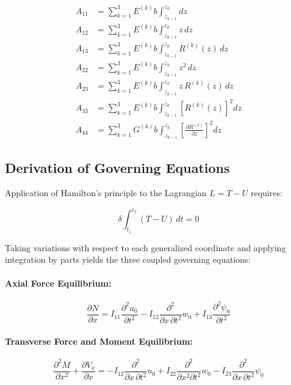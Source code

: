 \documentclass[12pt,a4paper]{report}
\begin{document}
\begin{align}
A_{11} &= \sum_{k=1}^{3} E^{(k)} b \int_{z_{k-1}}^{z_k} dz \\[6pt]
A_{12} &= \sum_{k=1}^{3} E^{(k)} b \int_{z_{k-1}}^{z_k} z \, dz \\[6pt]
A_{13} &= \sum_{k=1}^{3} E^{(k)} b \int_{z_{k-1}}^{z_k} R^{(k)}(z) \, dz \\[6pt]
A_{22} &= \sum_{k=1}^{3} E^{(k)} b \int_{z_{k-1}}^{z_k} z^2 \, dz \\[6pt]
A_{23} &= \sum_{k=1}^{3} E^{(k)} b \int_{z_{k-1}}^{z_k} z \, R^{(k)}(z) \, dz \\[6pt]
A_{33} &= \sum_{k=1}^{3} E^{(k)} b \int_{z_{k-1}}^{z_k} \left[R^{(k)}(z)\right]^2 dz \\[6pt]
A_{44} &= \sum_{k=1}^{3} G^{(k)} b \int_{z_{k-1}}^{z_k} \left[ \frac{\partial R^{(k)}}{\partial z} \right]^2 dz
\end{align}


\subsection*{Derivation of Governing Equations}

Application of Hamilton's principle to the Lagrangian $L = T - U$ requires:

\begin{equation}
\delta \int_{t_1}^{t_2} (T - U) \, dt = 0
\end{equation}

Taking variations with respect to each generalized coordinate and applying integration by parts yields the three coupled governing equations:

\paragraph{Axial Force Equilibrium:}
\begin{equation}
\frac{\partial N}{\partial x} 
= I_{11} \frac{\partial^2 u_0}{\partial t^2} 
- I_{12} \frac{\partial^2}{\partial x \, \partial t^2} w_0 
+ I_{13} \frac{\partial^2 \psi_0}{\partial t^2}
\end{equation}

\paragraph{Transverse Force and Moment Equilibrium:}
\begin{equation}
\frac{\partial^2 M}{\partial x^2} + \frac{\partial V_x}{\partial x} 
= -I_{12} \frac{\partial^2}{\partial x \, \partial t^2} u_0 
+ I_{22} \frac{\partial^2}{\partial x^2 \partial t^2} w_0 
- I_{23} \frac{\partial^2}{\partial x \, \partial t^2} \psi_0
\end{equation}
\end{document}
